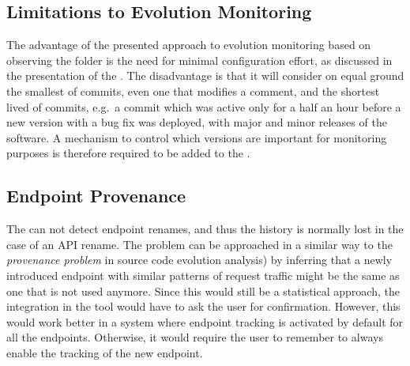   \subsection*{Limitations to Evolution Monitoring}

      The advantage of the presented approach to evolution monitoring based on observing the  folder is the need for minimal configuration effort, as discussed in the presentation of the \tool. The disadvantage is that it will consider on equal ground the smallest of commits, even one that modifies a comment, and the shortest lived of commits, e.g.~a commit which was active only for a half an hour before a new version with a bug fix was deployed, with major and minor releases of the software. %
    A mechanism to control which versions are important for monitoring purposes is therefore required to be added to the \tool.


  \subsection*{Endpoint Provenance }

    The \tool can not detect endpoint renames, and thus the history is normally lost in the case of an API rename. The problem can be approached in a similar way to the {\em provenance problem} in source code evolution analysis)\cite{Davi11a} by inferring that a newly introduced endpoint with similar patterns of request traffic might be the same as one that is not used anymore. Since this would still be a statistical approach, the integration in the tool would have to ask the user for confirmation. 
    However, this would work better in a system where endpoint tracking is activated by default for all the endpoints. Otherwise, it would require the user to remember to always enable the tracking of the new endpoint. 






